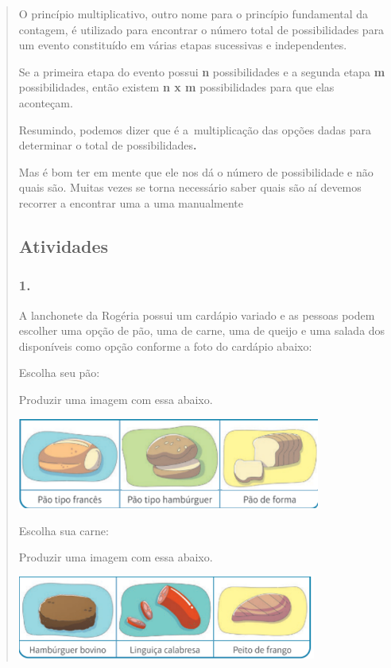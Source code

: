 \begin{enumerate}
\begin{escolha}
\begin{enumerate}
\begin{itemize}
\begin{itemize}
\begin{escolha}
\begin{quote}
\begin{escolha}
{O princípio multiplicativo, outro nome para o princípio fundamental da
contagem, é utilizado para encontrar o número total de possibilidades
para um evento constituído em várias etapas sucessivas e independentes.

Se a primeira etapa do evento possui \textbf{n} possibilidades e a
segunda etapa \textbf{m} possibilidades, então existem \textbf{n x m}
possibilidades para que elas aconteçam.

Resumindo, podemos dizer que é a~multiplicação das opções dadas para
determinar o total de possibilidades\textbf{.}

Mas é bom ter em mente que ele nos dá o número de possibilidade e não
quais são. Muitas vezes se torna necessário saber quais são aí devemos
recorrer a encontrar uma a uma manualmente

\subsection{Atividades}\label{atividades-10}

\subsubsection{1.}\label{section-130}

A lanchonete da Rogéria possui um cardápio variado e as pessoas podem
escolher uma opção de pão, uma de carne, uma de queijo e uma salada dos
disponíveis como opção conforme a foto do cardápio abaixo:

Escolha seu pão:

Produzir uma imagem com essa abaixo.

\includegraphics[width=3.91667in,height=1.17426in]{media/image134.png}

Escolha sua carne:

Produzir uma imagem com essa abaixo.

\includegraphics[width=3.86538in,height=1.06976in]{media/image135.png}

}
\end{escolha}
\end{quote}
\end{escolha}
\end{itemize}
\end{itemize}
\end{enumerate}
\end{escolha}
\end{enumerate}
